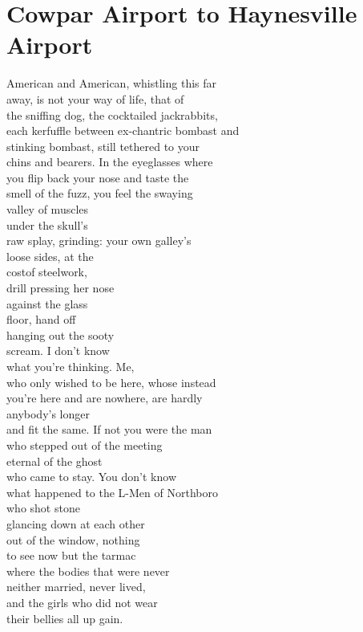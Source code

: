 \documentclass[smalldemyvopaper,11pt,twoside,onecolumn,openright,extrafontsizes]{memoir}
\begin{document}
\chapter{Cowpar Airport to Haynesville Airport}
American and American, whistling this far
\\away, is not your way of life, that of
\\the sniffing dog, the cocktailed jackrabbits,
\\each kerfuffle between ex-chantric bombast and
\\stinking bombast, still tethered to your
\\chins and bearers. In the eyeglasses where
\\you flip back your nose and taste the
\\smell of the fuzz, you feel the swaying
\\valley of muscles
\\under the skull's
\\raw splay, grinding: your own galley's
\\loose sides, at the
\\costof steelwork,
\\drill pressing her nose
\\against the glass
\\floor, hand off
\\hanging out the sooty
\\scream. I don't know
\\what you're thinking. Me,
\\who only wished to be here, whose instead
\\you're here and are nowhere, are hardly
\\anybody's longer
\\and fit the same. If not you were the man
\\who stepped out of the meeting
\\eternal of the ghost
\\who came to stay. You don't know
\\what happened to the L-Men of Northboro
\\who shot stone
\\glancing down at each other
\\out of the window, nothing
\\to see now but the tarmac
\\where the bodies that were never
\\neither married, never lived,
\\and the girls who did not wear
\\their bellies all up gain.
\end{document}
